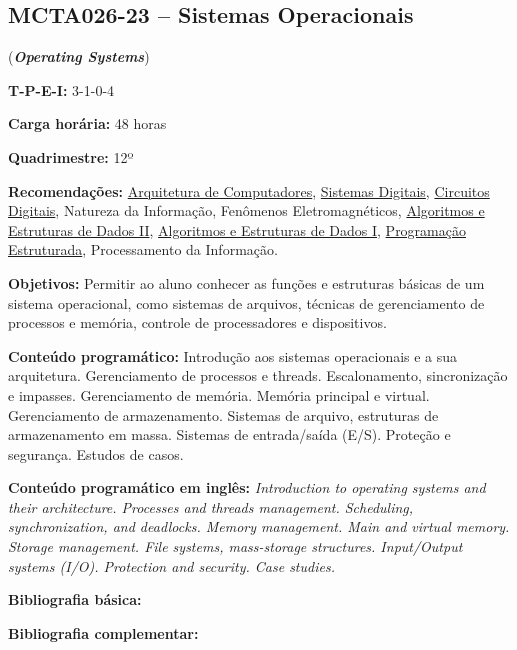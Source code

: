 \documentclass[class=article, crop=false]{standalone}
\begin{document}
\subsection{MCTA026-23 -- Sistemas Operacionais}
\label{disc:so}

(\textbf{\textit{Operating Systems}})

\begin{center}
\begin{minipage}{0.85\textwidth}
    \textbf{T-P-E-I:} 3-1-0-4
    
    \textbf{Carga horária:} 48 horas
    
    \textbf{Quadrimestre:} 12º
    
    \textbf{Recomendações:} 
    \hyperref[disc:arq]{Arquitetura de Computadores},
    \hyperref[disc:sist_dig]{Sistemas Digitais},
    \hyperref[disc:circ_dig]{Circuitos Digitais},
    Natureza da Informação, 
    Fenômenos Eletromagnéticos,
    \hyperref[disc:aedII]{Algoritmos e Estruturas de Dados II},
    \hyperref[disc:aedI]{Algoritmos e Estruturas de Dados I},
    \hyperref[disc:pe]{Programação Estruturada}, 
    Processamento da Informação.
\end{minipage}
\end{center}

\textbf{Objetivos:}
Permitir ao aluno conhecer as funções e estruturas básicas de um sistema
operacional, como sistemas de arquivos, técnicas de gerenciamento de processos
e memória, controle de processadores e dispositivos. 

\textbf{Conteúdo programático:}
Introdução aos sistemas operacionais e a sua arquitetura. 
Gerenciamento de processos e threads.
Escalonamento, sincronização e impasses.
Gerenciamento de memória. 
Memória principal e virtual. 
Gerenciamento de armazenamento. 
Sistemas de arquivo, estruturas de armazenamento em massa. 
Sistemas de entrada/saída (E/S). 
Proteção e segurança. 
Estudos de casos.

\textbf{Conteúdo programático em inglês:}
\textit{Introduction to operating systems and their architecture. 
Processes and threads management. 
Scheduling, synchronization, and deadlocks. 
Memory management. 
Main and virtual memory. 
Storage management. 
File systems, mass-storage structures. 
Input/Output systems (I/O). 
Protection and security. 
Case studies.}


\newrefsection
\textbf{Bibliografia básica:}
\nocite{2010-silberschatz, 2016-tanenbaum, 2005-deitel}
\printbibliography

\newrefsection
\textbf{Bibliografia complementar:}
\nocite{2018-flynn, 2009-stallings, 2005-bovet, 2008-tanenbaum, 2004-oliveira}
\printbibliography
\end{document}
